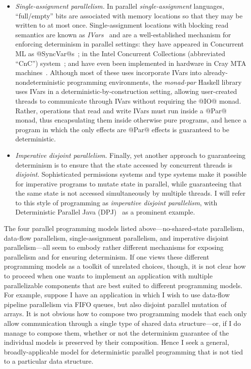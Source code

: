 \begin{itemize}
\item \emph{Single-assignment parallelism.}  In parallel
  \emph{single-assignment} languages, ``full/empty'' bits are
  associated with memory locations so that they may be written to at
  most once. Single-assignment locations with blocking read semantics
  are known as \emph{IVars}~\cite{IStructures} and are a
  well-established mechanism for enforcing determinism in parallel
  settings: they have appeared in Concurrent ML as
  @SyncVar@s~\cite{reppy-cml-book}; in the Intel Concurrent
  Collections (abbreviated ``CnC'') system~\cite{CnC}; and have even
  been implemented in hardware in Cray MTA machines~\cite{cray-mta}.
  Although most of these uses incorporate IVars into
  already-nondeterministic programming environments, the
  \emph{monad-par} Haskell library~\cite{monad-par} uses IVars in a
  deterministic-by-construction setting, allowing user-created threads
  to communicate through IVars without requiring the @IO@ monad.
  Rather, operations that read and write IVars must run inside a @Par@
  monad, thus encapsulating them inside otherwise pure programs, and
  hence a program in which the only effects are @Par@ effects is
  guaranteed to be deterministic.

\item \emph{Imperative disjoint parallelism.}  Finally, yet another
  approach to guaranteeing determinism is to ensure that the state
  accessed by concurrent threads is \emph{disjoint}.  Sophisticated
  permissions systems and type systems make it possible for imperative
  programs to mutate state in parallel, while guaranteeing that the
  same state is not accessed simultaneously by multiple threads.  I
  will refer to this style of programming as \emph{imperative disjoint
    parallelism}, with Deterministic Parallel Java
  (DPJ)~\cite{dpj-oopsla, dpj-hotpar09} as a prominent example.
\end{itemize}
The four parallel programming models listed above---no-shared-state
parallelism, data-flow parallelism, single-assignment parallelism, and
imperative disjoint parallelism---all seem to embody rather different
mechanisms for exposing parallelism and for ensuring determinism.  If
one views these different programming models as a toolkit of unrelated
choices, though, it is not clear how to proceed when one wants to
implement an application with multiple parallelizable components that
are best suited to different programming models.  For example, suppose
I have an application in which I wish to use data-flow pipeline
parallelism via FIFO queues, but also disjoint parallel mutation of
arrays.  It is not obvious how to compose two programming models that
each only allow communication through a single type of shared data
structure---or, if I do manage to compose them, whether or not the
determinism guarantee of the individual models is preserved by their
composition.  Hence I seek a general, broadly-applicable model for
deterministic parallel programming that is not tied to a particular
data structure.

